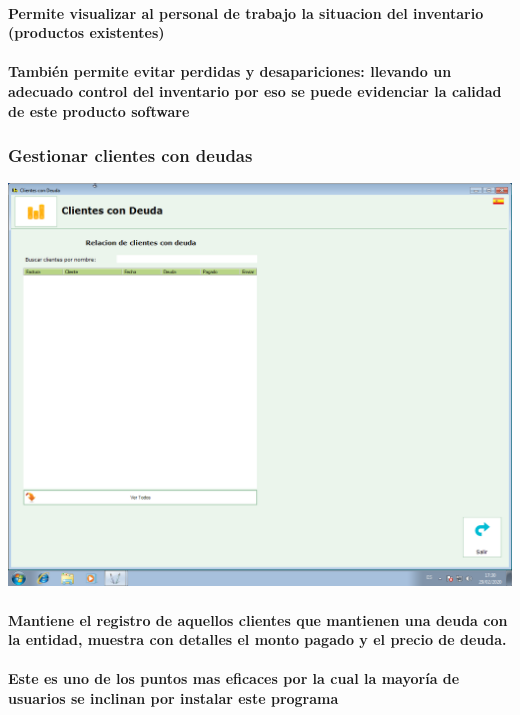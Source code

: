 \documentclass[12pt,a4paper]{article}
\begin{document}
\paragraph{Permite visualizar al personal de trabajo la situacion del inventario (productos existentes)} 
\paragraph{También permite evitar perdidas y desapariciones: llevando un adecuado control del inventario por eso se puede evidenciar la calidad de este producto software}

\subsubsection*{Gestionar clientes con deudas}
\includegraphics[scale=0.35]{Clientes con deuda.png} 
\paragraph{Mantiene el registro de aquellos clientes que mantienen una deuda con la entidad, muestra con detalles el monto pagado y el precio de deuda.}
\paragraph{Este es uno de los puntos mas eficaces por la cual la mayoría de usuarios se inclinan por instalar este programa}
\end{document}

